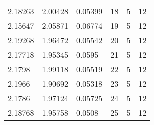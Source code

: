 \begin{table}[H]
\begin{tabular}{|lll|lll|}
2.18263                        & 2.00428                        & 0.05399                       & 18      & 5         & 12      \\
{\color[HTML]{FE0000} 2.15647} & 2.05871                        & 0.06774                       & 19      & 5         & 12      \\
2.19268                        & 1.96472                        & 0.05542                       & 20      & 5         & 12      \\
2.17718                        & 1.95345                        & 0.0595                        & 21      & 5         & 12      \\
2.1798                         & 1.99118                        & 0.05519                       & 22      & 5         & 12      \\
2.1966                         & {\color[HTML]{FE0000} 1.90692} & 0.05318                       & 23      & 5         & 12      \\
2.1786                         & 1.97124                        & 0.05725                       & 24      & 5         & 12      \\
2.18768                        & 1.95758                        & {\color[HTML]{FE0000} 0.0508} & 25      & 5         & 12      \\ \hline
\end{tabular}
\end{table}

\vspace{0.5cm}



